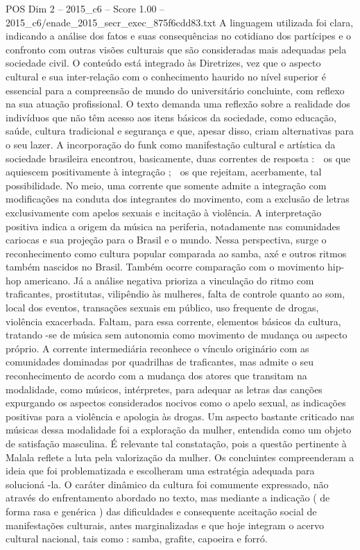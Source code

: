 \begin{textsample}{POS Dim 2 – 2015\_c6 – Score 1.00 – 2015\_c6/enade\_2015\_secr\_exec\_875f6cdd83.txt}
A linguagem utilizada foi clara, indicando a análise dos fatos e suas consequências no cotidiano dos partícipes e o confronto com outras visões culturais que são consideradas mais adequadas pela sociedade civil.
O conteúdo está integrado às Diretrizes, vez que o aspecto cultural e sua inter-relação com o conhecimento haurido no nível superior é essencial para a compreensão de mundo do universitário concluinte, com reflexo na sua atuação profissional.
O texto demanda uma reflexão sobre a realidade dos indivíduos que não têm acesso aos itens básicos da sociedade, como educação, saúde, cultura tradicional e segurança e que, apesar disso, criam alternativas para o seu lazer.
A incorporação do funk como manifestação cultural e artística da sociedade brasileira encontrou, basicamente, duas correntes de resposta :  os que aquiescem positivamente à integração ;  os que rejeitam, acerbamente, tal possibilidade.
No meio, uma corrente que somente admite a integração com modificações na conduta dos integrantes do movimento, com a exclusão de letras exclusivamente com apelos sexuais e incitação à violência.
A interpretação positiva indica a origem da música na periferia, notadamente nas comunidades cariocas e sua projeção para o Brasil e o mundo.
Nessa perspectiva, surge o reconhecimento como cultura popular comparada ao samba, axé e outros ritmos também nascidos no Brasil.
Também ocorre comparação com o movimento hip-hop americano.
Já a análise negativa prioriza a vinculação do ritmo com traficantes, prostitutas, vilipêndio às mulheres, falta de controle quanto ao som, local dos eventos, transações sexuais em público, uso frequente de drogas, violência exacerbada.
Faltam, para essa corrente, elementos básicos da cultura, tratando -se de música sem autonomia como movimento de mudança ou aspecto próprio.
A corrente intermediária reconhece o vínculo originário com as comunidades dominadas por quadrilhas de traficantes, mas admite o seu reconhecimento de acordo com a mudança dos atores que transitam na modalidade, como músicos, intérpretes, para adequar as letras das canções expurgando os aspectos considerados nocivos como o apelo sexual, as indicações positivas para a violência e apologia às drogas.
Um aspecto bastante criticado nas músicas dessa modalidade foi a exploração da mulher, entendida como um objeto de satisfação masculina.
É relevante tal constatação, pois a questão pertinente à Malala reflete a luta pela valorização da mulher.
Os concluintes compreenderam a ideia que foi problematizada e escolheram uma estratégia adequada para solucioná -la.
O caráter dinâmico da cultura foi comumente expressado, não através do enfrentamento abordado no texto, mas mediante a indicação ( de forma rasa e genérica ) das dificuldades e consequente aceitação social de manifestações culturais, antes marginalizadas e que hoje integram o acervo cultural nacional, tais como : samba, grafite, capoeira e forró.

\end{textsample}
